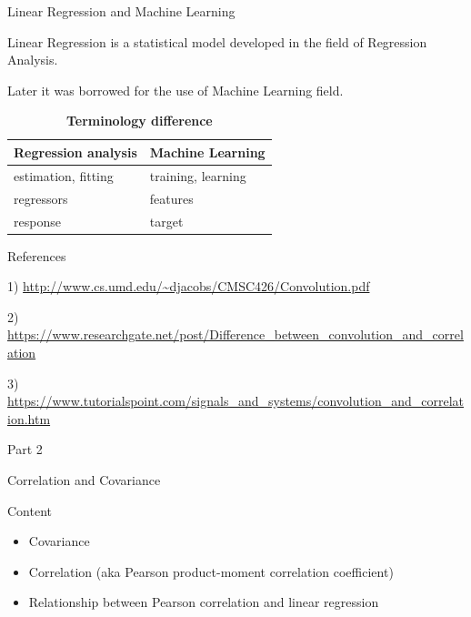 \documentclass{beamer}
\begin{document}

\begin{frame}
{\centerline{Linear Regression and Machine Learning}}
Linear Regression is a statistical model developed in the field of Regression Analysis.

Later it was borrowed for the use of Machine Learning field.

\begin{table}[]
\centering
\caption{\textbf{Terminology difference}}
\begin{tabular}{|l|l|}
\toprule
\textbf{Regression analysis} & \textbf{Machine Learning} \\ \midrule
estimation, fitting          & training, learning         \\ \midrule
regressors                   & features                   \\ \midrule
response                     & target                    \\ \bottomrule
\end{tabular}
\end{table}

\end{frame}


\begin{frame}
{ \centerline{References}}

1) \url{http://www.cs.umd.edu/~djacobs/CMSC426/Convolution.pdf}
\newline 

2) \url{https://www.researchgate.net/post/Difference\_between\_convolution\_and\_correlation}
\newline 

3) \url{https://www.tutorialspoint.com/signals\_and\_systems/convolution\_and\_correlation.htm}

\end{frame}

\begin{frame}
{\centerline{Part 2}}

\begin{center}
\Huge Correlation and Covariance
\end{center}
\end{frame}


\begin{frame}
{\centerline{Content}}

\begin{itemize}
\item Covariance
\item Correlation (aka Pearson product-moment correlation coefficient)
\item Relationship between Pearson correlation and linear regression
\end{itemize}
\end{frame}
\end{document}
